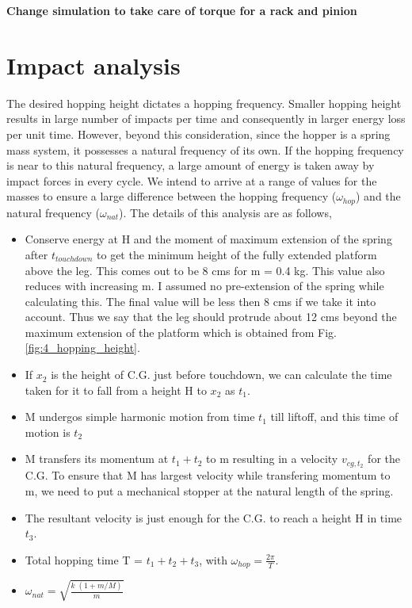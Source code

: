 \textbf{Change simulation to take care of torque for a rack and pinion}

\section{Impact analysis}
\label{sec:4_impact}
The desired hopping height dictates a hopping frequency. Smaller hopping height results in large number of impacts per time
and consequently in larger energy loss per unit time. However, beyond this consideration, since the hopper is a spring mass
system, it possesses a natural frequency of its own. If the hopping frequency is near to this natural frequency, a large
amount of energy is taken away by impact forces in every cycle. We intend to arrive at a range of values for the masses
to ensure a large difference between the hopping frequency ($\omega_{hop}$) and the natural frequency ($\omega_{nat}$).
The details of this analysis are as follows,
\begin{itemize}
\item 
Conserve energy at H and the moment of maximum extension of the spring after $t_{touchdown}$ to get the minimum height of the
fully extended platform above the leg. This comes out to be 8 cms for m = 0.4 kg. This value also reduces with increasing m. I
assumed no pre-extension of the spring while calculating this. The final value will be less then 8 cms if we take it into account.
Thus we say that the leg should protrude about 12 cms beyond the maximum extension of the platform which is obtained from Fig.
\ref{fig:4_hopping_height}.
\item
If $x_2$ is the height of C.G. just before touchdown, we can calculate the time taken for it to fall from a height H to $x_2$ as
$t_1$.
\item
M undergos simple harmonic motion from time $t_1$ till liftoff, and this time of motion is $t_2$
\item
M transfers its momentum at $t_1 + t_2$ to m resulting in a velocity $v_{cg, t_{2}}$ for the C.G. To ensure that M has largest
velocity while transfering momentum to m, we need to put a mechanical stopper at the natural length of the spring.
\item
The resultant velocity is just enough for the C.G. to reach a height H in time $t_3$.
\item
Total hopping time T = $t_1 + t_2 + t_3$, with $\omega_{hop} = \frac{2\pi}{T}$.
\item
$\omega_{nat} = \sqrt{\frac{k\;(1+m/M)}{m}}$
\end{itemize}

